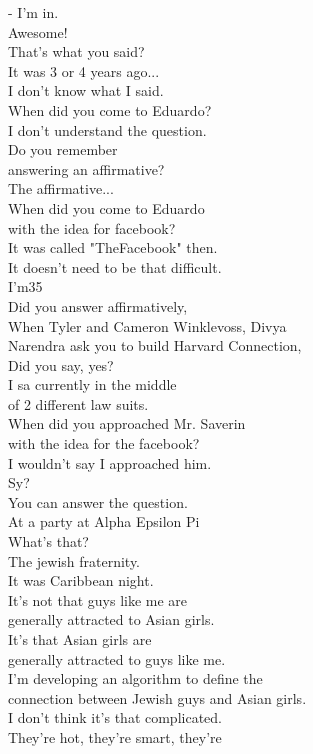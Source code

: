 \documentclass{article}
\begin{document}
\begin{multicols}{3}
- I'm in.\\
Awesome!\\
That's what you said?\\
It was 3 or 4 years ago...\\
I don't know what I said.\\
When did you come to Eduardo?\\
I don't understand the question.\\
Do you remember\\
answering an affirmative?\\
The affirmative...\\
When did you come to Eduardo\\
with the idea for facebook?\\
It was called "TheFacebook" then.\\
It doesn't need to be that difficult.\\
I'm35\\
Did you answer affirmatively,\\
When Tyler and Cameron Winklevoss, Divya\\
Narendra ask you to build Harvard Connection,\\
Did you say, yes?\\
I sa currently in the middle\\
of 2 different law suits.\\
When did you approached Mr. Saverin\\
with the idea for the facebook?\\
I wouldn't say I approached him.\\
Sy?\\
You can answer the question.\\
At a party at Alpha Epsilon Pi\\
What's that?\\
The jewish fraternity.\\
It was Caribbean night.\\
It's not that guys like me are\\
generally attracted to Asian girls.\\
It's that Asian girls are\\
generally attracted to guys like me.\\
I'm developing an algorithm to define the\\
connection between Jewish guys and Asian girls.\\
I don't think it's that complicated.\\
They're hot, they're smart, they're\\

\end{multicols}
\end{document}

